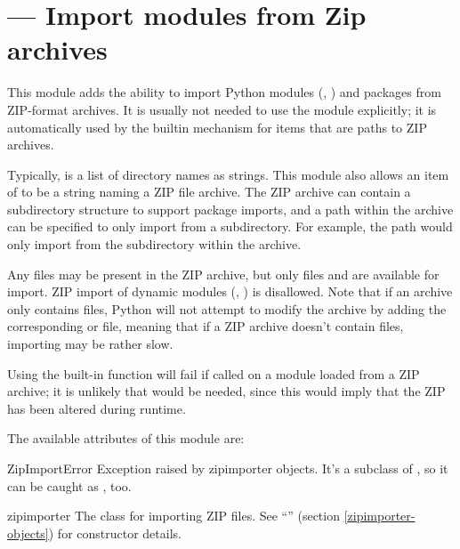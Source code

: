 \section{ ---
         Import modules from Zip archives}



This module adds the ability to import Python modules (,
) and packages from ZIP-format archives. It is usually
not needed to use the  module explicitly; it is
automatically used by the builtin  mechanism for
 items that are paths to ZIP archives.

Typically,  is a list of directory names as strings.  This
module also allows an item of  to be a string naming a ZIP
file archive. The ZIP archive can contain a subdirectory structure to
support package imports, and a path within the archive can be specified to
only import from a subdirectory.  For example, the path
 would only import from the
 subdirectory within the archive.

Any files may be present in the ZIP archive, but only files  and
 are available for import.  ZIP import of dynamic modules
(, ) is disallowed. Note that if an archive only
contains  files, Python will not attempt to modify the archive
by adding the corresponding  or  file, meaning that
if a ZIP archive doesn't contain  files, importing may be rather
slow.

Using the built-in  function will
fail if called on a module loaded from a ZIP archive; it is unlikely that
 would be needed, since this would imply that the ZIP
has been altered during runtime.

The available attributes of this module are:

\begin{excdesc}{ZipImportError}
  Exception raised by zipimporter objects. It's a subclass of
  , so it can be caught as ,
  too.
\end{excdesc}

\begin{classdesc*}{zipimporter}
  The class for importing ZIP files.  See
  ``'' (section \ref{zipimporter-objects})
  for constructor details.
\end{classdesc*}


